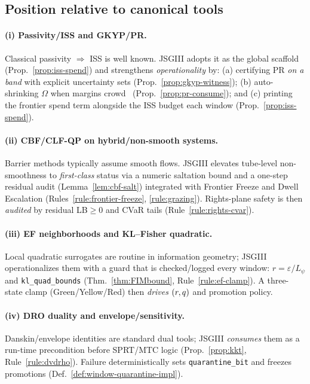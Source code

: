 \subsection{Position relative to canonical tools}\label{subsec:rel-canon}
\emph{}

\paragraph{(i) Passivity/ISS and GKYP/PR.}
Classical passivity $\Rightarrow$ ISS is well known. JSGIII adopts it as the global scaffold (Prop.~\ref{prop:iss-spend}) and strengthens \emph{operationality} by: (a) certifying PR \emph{on a band} with explicit uncertainty sets (Prop.~\ref{prop:gkyp-witness}); (b) auto-shrinking $\Omega$ when margins crowd \constsymPRmargin\ (Prop.~\ref{prop:pr-consume}); and (c) printing the frontier spend term alongside the ISS budget each window (Prop.~\ref{prop:iss-spend}).

\paragraph{(ii) CBF/CLF-QP on hybrid/non-smooth systems.}
Barrier methods typically assume smooth flows. JSGIII elevates tube-level non-smoothness to \emph{first-class} status via a numeric saltation bound and a one-step residual audit (Lemma~\ref{lem:cbf-salt}) integrated with Frontier Freeze and Dwell Escalation (Rules~\ref{rule:frontier-freeze}, \ref{rule:grazing}). Rights-plane safety is then \emph{audited} by residual LB$\ge0$ and CVaR tails (Rule~\ref{rule:rights-cvar}).

\paragraph{(iii) EF neighborhoods and KL–Fisher quadratic.}
Local quadratic surrogates are routine in information geometry; JSGIII operationalizes them with a guard that is checked/logged every window: $r=\varepsilon/L_\psi$ and \texttt{kl\_quad\_bounds} (Thm.~\ref{thm:FIMbound}, Rule~\ref{rule:ef-clamp}). A three-state clamp (Green/Yellow/Red) then \emph{drives} $(r,q)$ and promotion policy.

\paragraph{(iv) DRO duality and envelope/sensitivity.}
Danskin/envelope identities are standard dual tools; JSGIII \emph{consumes} them as a run-time precondition before SPRT/MTC logic (Prop.~\ref{prop:kkt}, Rule~\ref{rule:dvdrho}). Failure deterministically sets \texttt{quarantine\_bit} and freezes promotions (Def.~\ref{def:window-quarantine-impl}).

